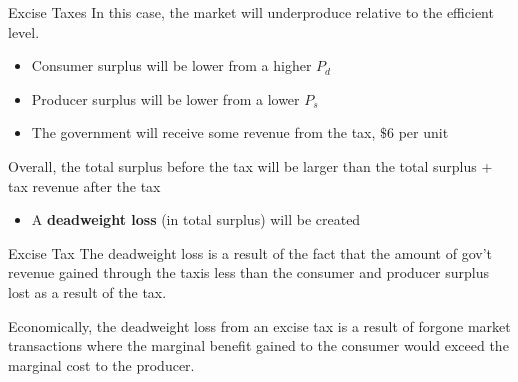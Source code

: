 \documentclass[11pt,t]{beamer}
\begin{document}
\begin{frame}{Excise Taxes}
  In this case, the market will underproduce relative to the efficient level.

  \begin{itemize}
    \item Consumer surplus will be lower from a higher $P_d$
    \item Producer surplus will be lower from a lower $P_s$
    \item The government will receive some revenue from the tax, $\$6$ per unit 
  \end{itemize}
  
  \bigskip
  Overall, the total surplus before the tax will be larger than the total surplus + tax revenue after the tax
  
  \begin{itemize}
    \item A \textbf{deadweight loss} (in total surplus) will be created
  \end{itemize}
\end{frame}

\begin{frame}{Excise Tax}
  The deadweight loss is a result of the fact that the amount of gov't revenue gained through the taxis less than the consumer and producer surplus lost as a result of the tax.

  \bigskip\pause
  Economically, the deadweight loss from an excise tax is a result of forgone market transactions where the marginal benefit gained to the consumer would exceed the marginal cost to the producer.
\end{frame}
\end{document}
